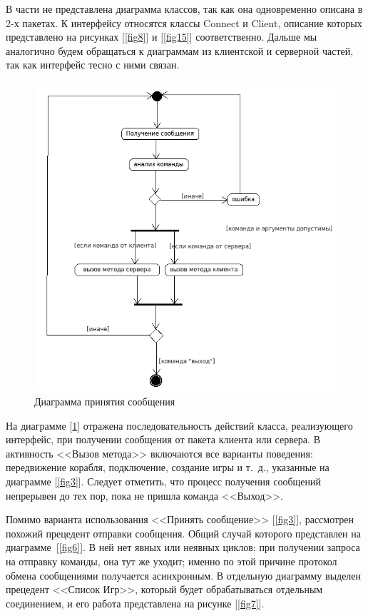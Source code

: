 В части не представлена диаграмма классов, так как она одновременно описана в 2-х пакетах. К интерфейсу относятся классы Connect и Client, описание которых представлено на рисунках [\ref{fig8}] и [\ref{fig15}] соответственно. Дальше мы аналогично будем обращаться к диаграммам из клиентской и серверной частей, так как интерфейс тесно с ними связан.

\begin{figure}[htp]
\centering
\includegraphics[width=12cm]{images/activity.png}
\caption{Диаграмма принятия сообщения}
\label{fig5}
\end{figure}

На диаграмме [\ref{fig5}] отражена последовательность действий класса, реализующего интерфейс, при получении сообщения от пакета клиента или сервера. В активность <<Вызов метода>> включаются все варианты поведения: передвижение корабля, подключение, создание игры и т.~д., указанные на диаграмме  [\ref{fig3}]. Следует отметить, что процесс получения сообщений непрерывен до тех пор, пока не пришла команда <<Выход>>.

Помимо варианта использования <<Принять сообщение>> [\ref{fig3}], рассмотрен похожий прецедент отправки сообщения. Общий случай которого представлен  на диаграмме~[\ref{fig6}]. В ней нет явных или неявных циклов: при получении  запроса на отправку команды, она тут же уходит; именно по этой причине протокол обмена сообщениями получается асинхронным. В отдельную диаграмму выделен прецедент <<Список Игр>>, который будет обрабатываться отдельным соединением, и его работа представлена на рисунке [\ref{fig7}].
 
